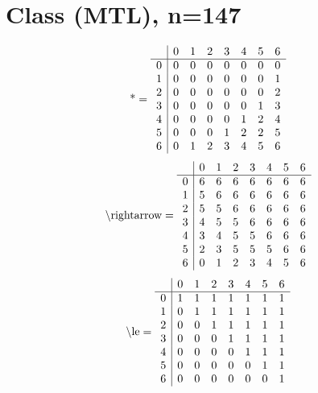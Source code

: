 \documentclass[11pt]{article}
\begin{document}
\section{Class (MTL), n=147}
\[\text{*} = 
\begin{array}{r | r r r r r r r}
 & 0 & 1 & 2 & 3 & 4 & 5 & 6 \\ \hline
0 & 0 & 0 & 0 & 0 & 0 & 0 & 0 \\
1 & 0 & 0 & 0 & 0 & 0 & 0 & 1 \\
2 & 0 & 0 & 0 & 0 & 0 & 0 & 2 \\
3 & 0 & 0 & 0 & 0 & 0 & 1 & 3 \\
4 & 0 & 0 & 0 & 0 & 1 & 2 & 4 \\
5 & 0 & 0 & 0 & 1 & 2 & 2 & 5 \\
6 & 0 & 1 & 2 & 3 & 4 & 5 & 6 \\
\end{array}
\]
\[\text{\textbackslash rightarrow} = 
\begin{array}{r | r r r r r r r}
 & 0 & 1 & 2 & 3 & 4 & 5 & 6 \\ \hline
0 & 6 & 6 & 6 & 6 & 6 & 6 & 6 \\
1 & 5 & 6 & 6 & 6 & 6 & 6 & 6 \\
2 & 5 & 5 & 6 & 6 & 6 & 6 & 6 \\
3 & 4 & 5 & 5 & 6 & 6 & 6 & 6 \\
4 & 3 & 4 & 5 & 5 & 6 & 6 & 6 \\
5 & 2 & 3 & 5 & 5 & 5 & 6 & 6 \\
6 & 0 & 1 & 2 & 3 & 4 & 5 & 6 \\
\end{array}
\]
\[\text{\textbackslash le} = 
\begin{array}{r | r r r r r r r}
 & 0 & 1 & 2 & 3 & 4 & 5 & 6 \\ \hline
0 & 1 & 1 & 1 & 1 & 1 & 1 & 1 \\
1 & 0 & 1 & 1 & 1 & 1 & 1 & 1 \\
2 & 0 & 0 & 1 & 1 & 1 & 1 & 1 \\
3 & 0 & 0 & 0 & 1 & 1 & 1 & 1 \\
4 & 0 & 0 & 0 & 0 & 1 & 1 & 1 \\
5 & 0 & 0 & 0 & 0 & 0 & 1 & 1 \\
6 & 0 & 0 & 0 & 0 & 0 & 0 & 1 \\
\end{array}
\]
\end{document}
